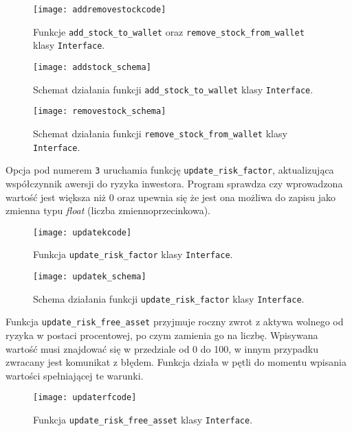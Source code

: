 \documentclass[magister]{dyplom}
\def\code#1{\texttt{#1}}
\begin{document}
\begin{figure}[ht!]
	\centering
	\texttt{[image: addremovestockcode]}
	\caption{Funkcje \code{add\_stock\_to\_wallet} oraz \code{remove\_stock\_from\_wallet} klasy \code{Interface}.}
\end{figure}

\begin{figure}[ht!]
	\centering
	\texttt{[image: addstock\_schema]}
	\caption{Schemat działania funkcji \code{add\_stock\_to\_wallet} klasy \code{Interface}.}
\end{figure}

\begin{figure}[ht!]
	\centering
	\texttt{[image: removestock\_schema]}
	\caption{Schemat działania funkcji \code{remove\_stock\_from\_wallet} klasy \code{Interface}.}
\end{figure}
\newpage
Opcja pod numerem \code{3} uruchamia funkcję \code{update\_risk\_factor}, aktualizująca współczynnik awersji do ryzyka inwestora. Program sprawdza czy wprowadzona wartość jest większa niż $0$ oraz upewnia się że jest ona możliwa do zapisu jako zmienna typu \textit{float} (liczba zmiennoprzecinkowa).

\begin{figure}[ht]
	\centering
	\texttt{[image: updatekcode]}
	\caption{Funkcja \code{update\_risk\_factor} klasy \code{Interface}.}
\end{figure}

\begin{figure}[ht!]
	\centering
	\texttt{[image: updatek\_schema]}
	\caption{Schema działania funkcji \code{update\_risk\_factor} klasy \code{Interface}.}
\end{figure}
\newpage
Funkcja \code{update\_risk\_free\_asset} przyjmuje roczny zwrot z aktywa wolnego od ryzyka w postaci procentowej, po czym zamienia go na liczbę. Wpisywana wartość musi znajdować się w przedziale od 0 do 100, w innym przypadku zwracany jest komunikat z błędem. Funkcja działa w pętli do momentu wpisania wartości spełniającej te warunki.

\begin{figure}[ht]
	\centering
	\texttt{[image: updaterfcode]}
	\caption{Funkcja \code{update\_risk\_free\_asset} klasy \code{Interface}.}
\end{figure}
\end{document}
